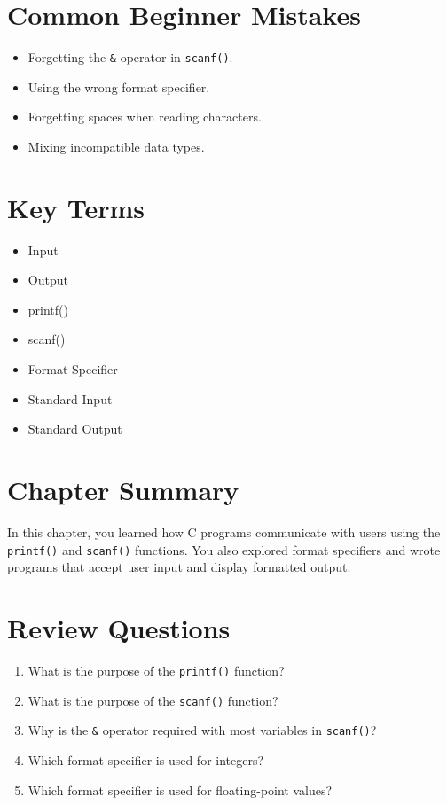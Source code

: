 \documentclass[12pt,openany]{book}
\begin{document}
\section{Common Beginner Mistakes}

\begin{itemize}
    \item Forgetting the \texttt{\&} operator in \texttt{scanf()}.
    \item Using the wrong format specifier.
    \item Forgetting spaces when reading characters.
    \item Mixing incompatible data types.
\end{itemize}

\section{Key Terms}

\begin{itemize}
    \item Input
    \item Output
    \item printf()
    \item scanf()
    \item Format Specifier
    \item Standard Input
    \item Standard Output
\end{itemize}

\section{Chapter Summary}

In this chapter, you learned how C programs communicate with users using the \texttt{printf()} and \texttt{scanf()} functions. You also explored format specifiers and wrote programs that accept user input and display formatted output.

\section{Review Questions}

\begin{enumerate}
    \item What is the purpose of the \texttt{printf()} function?
    \item What is the purpose of the \texttt{scanf()} function?
    \item Why is the \texttt{\&} operator required with most variables in \texttt{scanf()}?
    \item Which format specifier is used for integers?
    \item Which format specifier is used for floating-point values?
\end{enumerate}
\end{document}
